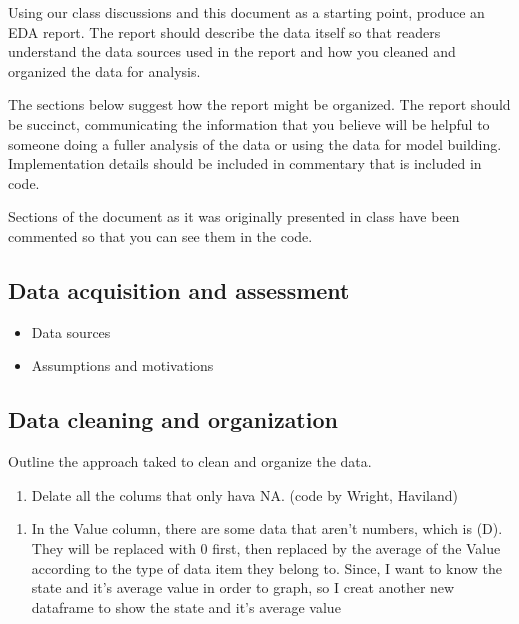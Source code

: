 \documentclass[
  letterpaper,
  DIV=11,
  numbers=noendperiod]{scrartcl}
\providecommand{\tightlist}{%
  \setlength{\itemsep}{0pt}\setlength{\parskip}{0pt}}\usepackage{longtable,booktabs,array}
\begin{document}
Using our class discussions and this document as a starting point,
produce an EDA report. The report should describe the data itself so
that readers understand the data sources used in the report and how you
cleaned and organized the data for analysis.

The sections below suggest how the report might be organized. The report
should be succinct, communicating the information that you believe will
be helpful to someone doing a fuller analysis of the data or using the
data for model building. Implementation details should be included in
commentary that is included in code.

Sections of the document as it was originally presented in class have
been commented so that you can see them in the code.

\hypertarget{data-acquisition-and-assessment}{%
\subsection{Data acquisition and
assessment}\label{data-acquisition-and-assessment}}

\begin{itemize}
\tightlist
\item
  Data sources\\
\item
  Assumptions and motivations
\end{itemize}

\hypertarget{data-cleaning-and-organization}{%
\subsection{Data cleaning and
organization}\label{data-cleaning-and-organization}}

Outline the approach taked to clean and organize the data.

\begin{enumerate}
\def\labelenumi{\arabic{enumi}.}
\tightlist
\item
  Delate all the colums that only hava NA. (code by Wright, Haviland)
\end{enumerate}

\begin{enumerate}
\def\labelenumi{\arabic{enumi}.}
\setcounter{enumi}{1}
\tightlist
\item
  In the Value column, there are some data that aren't numbers, which is
  (D). They will be replaced with 0 first, then replaced by the average
  of the Value according to the type of data item they belong to. Since,
  I want to know the state and it's average value in order to graph, so
  I creat another new dataframe to show the state and it's average value
\end{enumerate}
\end{document}
